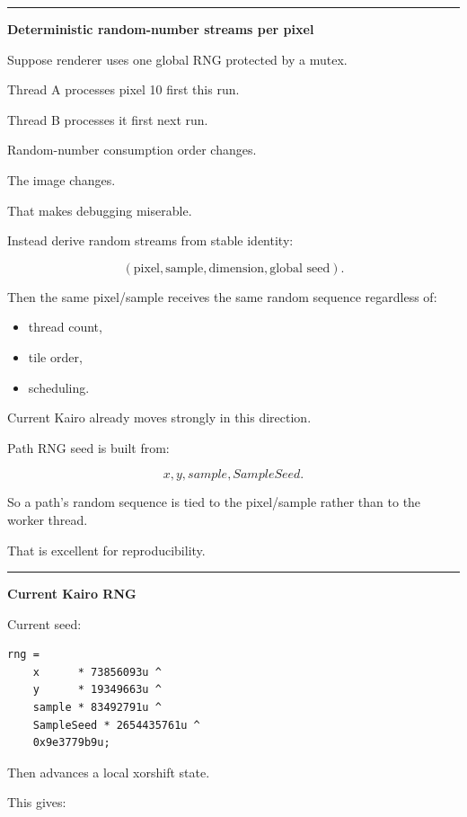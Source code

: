 \begin{center}\rule{0.5\linewidth}{0.5pt}\end{center}

\textbf{Deterministic random-number streams per pixel}

Suppose renderer uses one global RNG protected by a mutex.

Thread A processes pixel 10 first this run.

Thread B processes it first next run.

Random-number consumption order changes.

The image changes.

That makes debugging miserable.

Instead derive random streams from stable identity:

\[
\boxed{
(\text{pixel},\text{sample},\text{dimension},\text{global seed}).
}
\]

Then the same pixel/sample receives the same random sequence regardless of:

\begin{itemize}
\tightlist
\item
  thread count,
\item
  tile order,
\item
  scheduling.
\end{itemize}

Current Kairo already moves strongly in this direction.

Path RNG seed is built from:

\[
x,
y,
sample,
SampleSeed.
\]

So a path's random sequence is tied to the pixel/sample rather than to the worker thread.

That is excellent for reproducibility.

\begin{center}\rule{0.5\linewidth}{0.5pt}\end{center}

\textbf{Current Kairo RNG}

Current seed:

\begin{verbatim}
rng =
    x      * 73856093u ^
    y      * 19349663u ^
    sample * 83492791u ^
    SampleSeed * 2654435761u ^
    0x9e3779b9u;
\end{verbatim}

Then  advances a local xorshift state.

This gives:

